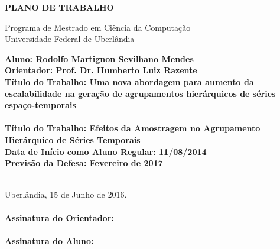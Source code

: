 \documentclass[12pt]{article}
\begin{document}


\begin{center}
    \bf{
        \LARGE{PLANO DE TRABALHO}
        \\ $\ $\\
    }
    
    \Large{
        Programa de Mestrado em Ciência da Computação\\
        Universidade Federal de Uberlândia
    }
    \\ $\ $\\
\end{center}

\begin{center}
    \bf{
        Aluno: Rodolfo Martignon Sevilhano Mendes\\ $\ $\\
        Orientador: Prof. Dr. Humberto Luiz Razente\\ $\ $\\
        Título do Trabalho: Uma nova abordagem para aumento da escalabilidade na
				geração de agrupamentos hierárquicos de séries espaço-temporais\\ \ \ \\
        Título do Trabalho: Efeitos da Amostragem no Agrupamento \\
				Hierárquico de Séries Temporais\\ $\ $\\
        Data de Início como Aluno Regular: 11/08/2014\\ $\ $\\
        Previsão da Defesa: Fevereiro de 2017\\ $\ $\\
    }
\end{center}









\begin{flushleft}
\ \\
\noindent Uberlândia, 15 de Junho de 2016. \\
\ \\
\noindent \textbf{Assinatura do Orientador:} \\
\ \\
\noindent \textbf{Assinatura do Aluno:} \\
\end{flushleft}
\end{document}
